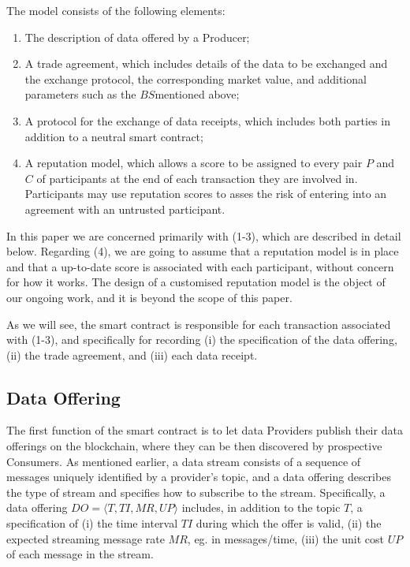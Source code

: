\documentclass[letterpaper, 10 pt, conference]{ieeeconf}  %
\newcommand{\topic}{\ensuremath{\mathit{T}}}
\newcommand{\bs}{\ensuremath{\mathit{BS}}}
\newcommand{\ti}{\ensuremath{\mathit{TI}}}
\newcommand{\mr}{\ensuremath{\mathit{MR}}}
\newcommand{\up}{\ensuremath{\mathit{UP}}}
\newcommand{\doff}{\ensuremath{\mathit{DO}}}
\begin{document}
The model consists of the following elements:
\begin{enumerate}
	
	\item The description of data offered by a Producer;
	
	\item A trade agreement, which includes details of the data to be exchanged and the exchange protocol, the corresponding market value, and additional parameters such as the \bs mentioned above;
	
	\item A protocol for the exchange of data receipts, which includes both parties in addition to a neutral smart contract;
	
	\item A reputation model, which allows a score to be assigned to every pair $P$ and $C$ of participants at the end of each transaction they are involved in. 
	Participants may use reputation scores to asses the risk of entering into an agreement with an untrusted participant.

\end{enumerate}

In this paper we are concerned primarily with (1-3), which are described in detail below. Regarding (4), we are going to assume that a reputation model is in place and that a up-to-date score is associated with each participant, without concern for how it works. The design of a customised reputation model is the object of our ongoing work, and it is beyond the scope of this paper.

As we will see, the smart contract is responsible for each transaction associated with (1-3), and specifically for recording (i) the specification of the data offering, (ii) the trade agreement, and (iii) each data receipt.

\subsection{Data Offering}

The first function of the smart contract is to let data Providers publish their data offerings on the blockchain, where they can be then discovered by prospective Consumers. 
As mentioned earlier, a data stream consists of a sequence of messages uniquely identified by  a provider's topic, and a data offering describes the type of stream and specifies how to subscribe to the stream.
Specifically, a data offering $\doff = \langle \topic, \ti, \mr, \up \rangle$ includes, in addition to the topic \topic, a specification of (i) the time interval \ti{} during which the offer is valid, (ii) the expected streaming message rate \mr, eg. in messages/time, (iii) the unit cost \up{} of each message in the stream.
\end{document}
